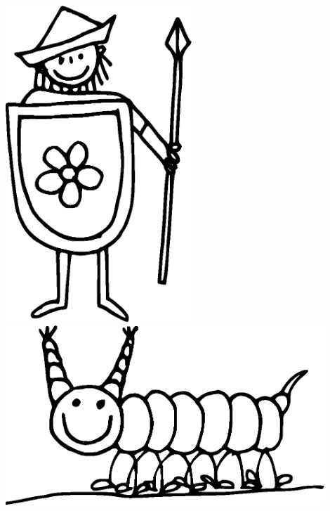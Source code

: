 \documentclass[11pt,a4paper,twoside]{article}
\begin{document}
\hspace*{4cm}\includegraphics[width=7cm]{3.eps}
\vfil
\pagebreak
\vfil
\pagebreak
\vfil
\includegraphics[width=12cm]{4.eps}
\vfil
\end{document}
